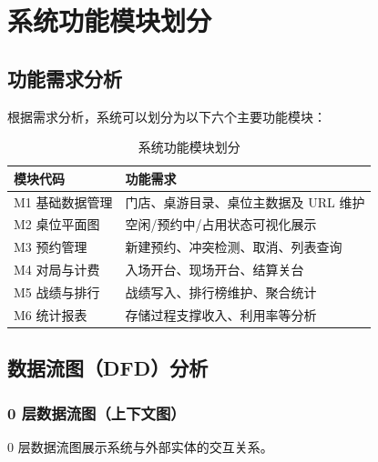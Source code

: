 \chapter{系统功能模块划分}

\section{功能需求分析}

根据需求分析，系统可以划分为以下六个主要功能模块：

\begin{table}[H]
  \centering
  \caption{系统功能模块划分}
  \label{tab:modules}
  \begin{tabularx}{\textwidth}{|l|X|}
    \hline
    \textbf{模块代码} & \textbf{功能需求} \\
    \hline
    M1 基础数据管理 & 门店、桌游目录、桌位主数据及 URL 维护 \\
    \hline
    M2 桌位平面图 & 空闲/预约中/占用状态可视化展示 \\
    \hline
    M3 预约管理 & 新建预约、冲突检测、取消、列表查询 \\
    \hline
    M4 对局与计费 & 入场开台、现场开台、结算关台 \\
    \hline
    M5 战绩与排行 & 战绩写入、排行榜维护、聚合统计 \\
    \hline
    M6 统计报表 & 存储过程支撑收入、利用率等分析 \\
    \hline
  \end{tabularx}
\end{table}

\section{数据流图（DFD）分析}

\subsection{0 层数据流图（上下文图）}

0 层数据流图展示系统与外部实体的交互关系。

